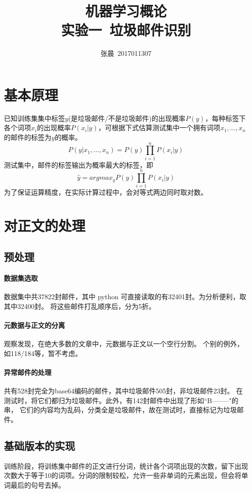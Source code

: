 \documentclass{article}
\title{机器学习概论\\实验一~垃圾邮件识别}
\author{张晨~2017011307}
\date{}
\begin{document}
\maketitle

\section{基本原理}
已知训练集集中标签$y$(是垃圾邮件/不是垃圾邮件)的出现概率$P(y)$，每种标签下各个词项$x_i$的出现概率$P\left(x_{i} | y\right)$，可根据下式估算测试集中一个拥有词项$x_1, ... ,x_n$的邮件的标签为$y$的概率。
\begin{equation}
\label{equ:bayes}
P\left(y | x_{1}, \ldots, x_{n}\right) =  P(y) \prod_{i=1}^{n} P\left(x_{i} | y\right)
\end{equation}
测试集中，邮件的标签输出为概率最大的标签，即
\begin{equation}
\hat{y}=argmax_{y} P(y) \prod_{i=1}^{n} P\left(x_{i} | y\right)
\end{equation}
为了保证运算精度，在实际计算过程中，会对等式两边同时取对数。
\section{对正文的处理}
\subsection{预处理}
\paragraph{数据集选取} 数据集中共37822封邮件，其中 python 可直接读取的有32401封。为分析便利，取其中32400封。
将这些邮件打乱顺序后，分为5折。
\paragraph{元数据与正文的分离} 观察发现，在绝大多数的文章中，元数据与正文以一个空行分割。
个别的例外，如118/184等，暂不考虑。
\paragraph{异常邮件的处理} 共有528封完全为base64编码的邮件，其中垃圾邮件505封，非垃圾邮件23封。
在测试时，将它们都归为垃圾邮件。此外，有142封邮件中出现了形如``B--------"的串，
它们的内容均为乱码，分类全是垃圾邮件，故在测试时，直接标记为垃圾邮件。

\subsection{基础版本的实现}
训练阶段，将训练集中邮件的正文进行分词，统计各个词项出现的次数，留下出现次数大于等于10的词项。分词的限制较松，允许一些非单词的元素出现，但会将单词最后的句号去掉。
\end{document}
